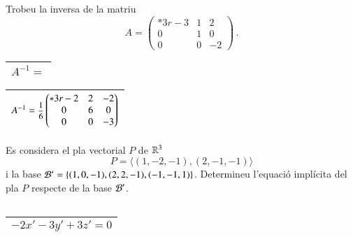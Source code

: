 \documentclass[11pt,catalan]{article}
\begin{document}
\begin{enunciat}
Trobeu la inversa de la matriu 
\[
  A = \begin{pmatrix}{*{3}r} -3 & 1 & 2\\ 0 & 1 & 0\\ 0 & 0 & -2\end{pmatrix}\,.
\]
\end{enunciat}

\begin{quadricula}
\begin{tabular}{|L{5cm}{1.25cm}|}
\hline
$A^{-1}=$ \\
\hline
\end{tabular}
\end{quadricula}

\begin{solucio}
\begin{center}
\begin{tabular}{|C{5cm}{1.25cm}|}
\hline
$A^{-1}=\deufrac{1}{6}\begin{pmatrix}{*{3}r} -2 & 2 & -2\\ 0 & 6 & 0\\ 0 & 0 & -3\end{pmatrix}$ \\
\hline
\end{tabular}
\end{center}
\end{solucio}


\begin{enunciat}
Es considera el pla vectorial $P$ de $\rn 3$
\[
  P = \langle (1,-2,-1), (2,-1,-1) \rangle
\]
i la base $\cal B'=\{(1,0,-1),(2,2,-1),(-1,-1,1)\}$. Determineu l'equació implícita del pla $P$ respecte de la base $\cal B'$.
\end{enunciat}

\begin{quadricula}
\begin{tabular}{|C{5cm}{0.5cm}|}
\hline
 \\
\hline
\end{tabular}
\end{quadricula}

\begin{solucio}
\begin{center}
\begin{tabular}{|C{5cm}{0.5cm}|}
\hline
$- 2 x' - 3 y' + 3 z' = 0$ \\
\hline
\end{tabular}
\end{center}
\end{solucio}
\end{document}
